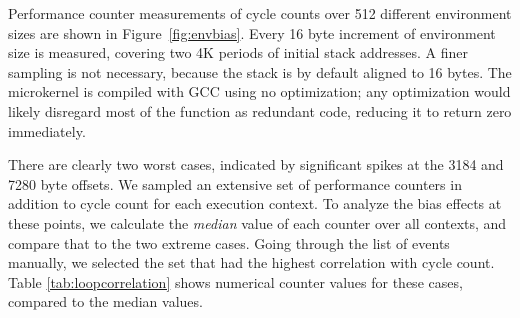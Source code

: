 \documentclass{acm_proc_article-sp}
\begin{document}
\begin{figure*}[t]
  \caption{Bias from environment size for microkernel. Measured average of 10 cycle count samples for 512 different environments. Spikes show aliasing case, occurring once for each 4K period.}
  \label{fig:envbias}
\end{figure*}

Performance counter measurements of cycle counts over 512 different environment sizes are shown in Figure~\ref{fig:envbias}.
Every 16 byte increment of environment size is measured, covering two 4K periods of initial stack addresses.
A finer sampling is not necessary, because the stack is by default aligned to 16 bytes.
The microkernel is compiled with {\small{GCC}} using no optimization; any optimization would likely disregard most of the function as redundant code, reducing it to return zero immediately.

There are clearly two worst cases, indicated by significant spikes at the 3184 and 7280 byte offsets.
We sampled an extensive set of performance counters in addition to cycle count for each execution context.
To analyze the bias effects at these points, we calculate the \emph{median} value of each counter over all contexts, and compare that to the two extreme cases.
Going through the list of events manually, we selected the set that had the highest correlation with cycle count.
Table \ref{tab:loopcorrelation} shows numerical counter values for these cases, compared to the median values.
\end{document}
